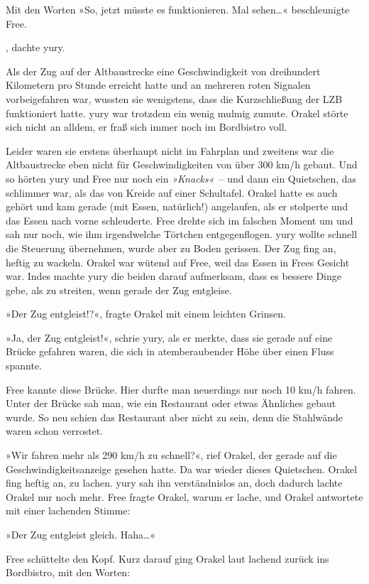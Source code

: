 Mit den Worten »So, jetzt müsste es funktionieren. Mal sehen…« beschleunigte Free.

, dachte yury.

Als der Zug auf der Altbaustrecke eine Geschwindigkeit von dreihundert Kilometern pro Stunde erreicht hatte und an mehreren roten Signalen vorbeigefahren war, wussten sie wenigstens, dass die Kurzschließung der LZB funktioniert hatte. yury war trotzdem ein wenig mulmig zumute. Orakel störte sich nicht an alldem, er fraß sich immer noch im Bordbistro voll.

Leider waren sie erstens überhaupt nicht im Fahrplan und zweitens war die Altbaustrecke eben nicht für Geschwindigkeiten von über 300 km/h gebaut. Und so hörten yury und Free nur noch ein \textit{»Knacks«}~– und dann ein Quietschen, das schlimmer war, als das von Kreide auf einer Schultafel. Orakel hatte es auch gehört und kam gerade (mit Essen, natürlich!) angelaufen, als er stolperte und das Essen nach vorne schleuderte. Free drehte sich im falschen Moment um und sah nur noch, wie ihm irgendwelche Törtchen entgegenflogen. yury wollte schnell die Steuerung übernehmen, wurde aber zu Boden gerissen. Der Zug fing an, heftig zu wackeln. Orakel war wütend auf Free, weil das Essen in Frees Gesicht war. Indes machte yury die beiden darauf aufmerksam, dass es bessere Dinge gebe, als zu streiten, wenn gerade der Zug entgleise.

»Der Zug entgleist!?«, fragte Orakel mit einem leichten Grinsen.

»Ja, der Zug entgleist!«, schrie yury, als er merkte, dass sie gerade auf eine Brücke gefahren waren, die sich in atemberaubender Höhe über einen Fluss spannte.

Free kannte diese Brücke. Hier durfte man neuerdings nur noch 10 km/h fahren. Unter der Brücke sah man, wie ein Restaurant oder etwas Ähnliches gebaut wurde. So neu schien das Restaurant aber nicht zu sein, denn die Stahlwände waren schon verrostet.

»Wir fahren mehr als 290 km/h zu schnell?«, rief Orakel, der gerade auf die Geschwindigkeitsanzeige gesehen hatte. Da war wieder dieses Quietschen. Orakel fing heftig an, zu lachen. yury sah ihn verständnislos an, doch dadurch lachte Orakel nur noch mehr. Free fragte Orakel, warum er lache, und Orakel antwortete mit einer lachenden Stimme:

»Der Zug entgleist gleich. Haha…«

Free schüttelte den Kopf. Kurz darauf ging Orakel laut lachend zurück ins Bordbistro, mit den Worten:


